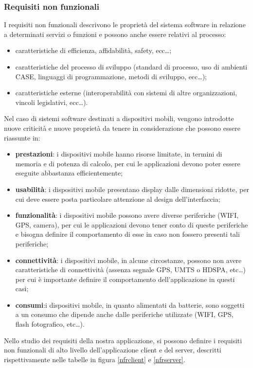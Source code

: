 \subsubsection{Requisiti non funzionali}
I requisiti non funzionali descrivono le proprietà del sistema software in relazione a determinati servizi o funzioni e possono anche essere relativi al processo:
\begin{itemize}
\item caratteristiche di efficienza, affidabilità, safety, ecc\dots;
\item caratteristiche del processo di sviluppo (standard di processo, uso di ambienti CASE, linguaggi di programmazione, metodi di sviluppo, ecc\dots);
\item caratteristiche esterne (interoperabilità con sistemi di altre organizzazioni, vincoli legislativi, ecc\dots).
\end{itemize}

Nel caso di sistemi software destinati a dispositivi mobili, vengono introdotte nuove criticità e nuove proprietà da tenere in considerazione che possono essere riassunte in:
\begin{itemize}
\item \textbf{prestazioni}: i dispositivi mobile hanno risorse limitate, in termini di memoria e di potenza di calcolo, per cui le applicazioni devono poter essere eseguite abbastanza efficientemente;
\item \textbf{usabilità}: i dispositivi mobile presentano display dalle dimensioni ridotte, per cui deve essere posta particolare attenzione al design dell'interfaccia;
\item \textbf{funzionalità}: i dispositivi mobile possono avere diverse periferiche (WIFI, GPS, camera), per cui le applicazioni devono tener conto di queste periferiche e bisogna definire il comportamento di esse in caso non fossero presenti tali periferiche;
\item \textbf{connettività}: i dispositivi mobile, in alcune circostanze, possono non avere caratteristiche di connettività (assenza segnale GPS, UMTS o HDSPA, etc\dots) per cui è importante definire il comportamento dell'applicazione in questi casi;
\item \textbf{consumi}:i dispositivi mobile, in quanto alimentati da batterie, sono soggetti a un consumo che dipende anche dalle periferiche utilizzate (WIFI, GPS, flash fotografico, etc\dots).
\end{itemize}

Nello studio dei requisiti della nostra applicazione, si possono definire i requisiti non funzionali di alto livello dell'applicazione client e del server, descritti rispettivamente nelle tabelle in figura \ref{nfrclient} e \ref{nfrserver}.

